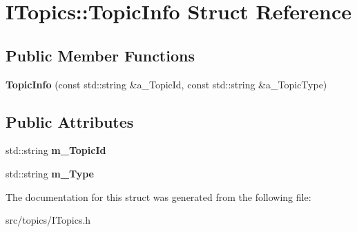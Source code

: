 \hypertarget{struct_i_topics_1_1_topic_info}{}\section{I\+Topics\+:\+:Topic\+Info Struct Reference}
\label{struct_i_topics_1_1_topic_info}
\subsection*{Public Member Functions}
\begin{DoxyCompactItemize}
\item 
\mbox{\label{struct_i_topics_1_1_topic_info_aed300329c3faa61b05ea8cc8a819f6f8}} 
{\bfseries Topic\+Info} (const std\+::string \&a\+\_\+\+Topic\+Id, const std\+::string \&a\+\_\+\+Topic\+Type)
\end{DoxyCompactItemize}
\subsection*{Public Attributes}
\begin{DoxyCompactItemize}
\item 
\mbox{\label{struct_i_topics_1_1_topic_info_a0ac28683b9c6a913b9ca19f848d1825a}} 
std\+::string {\bfseries m\+\_\+\+Topic\+Id}
\item 
\mbox{\label{struct_i_topics_1_1_topic_info_a0780827fc9300623b233889b1527a868}} 
std\+::string {\bfseries m\+\_\+\+Type}
\end{DoxyCompactItemize}


The documentation for this struct was generated from the following file\+:\begin{DoxyCompactItemize}
\item 
src/topics/I\+Topics.\+h\end{DoxyCompactItemize}
